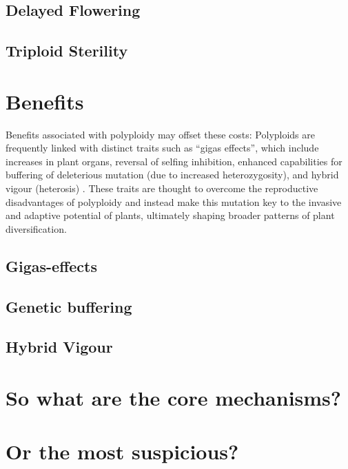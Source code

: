 \documentclass[openany, 12pt, draft]{book}
\begin{document}
\subsection{Delayed Flowering}\label{delayed-flowering}

\subsection{Triploid Sterility}\label{triploid-sterility}

\section{Benefits}\label{benefits}

Benefits associated with polyploidy may offset these costs: Polyploids
are frequently linked with distinct traits such as ``gigas effects'',
which include increases in plant organs, reversal of selfing inhibition,
enhanced capabilities for buffering of deleterious mutation (due to
increased heterozygosity), and hybrid vigour (heterosis)
\citep{Woodhouse2009, Ramsey2014}. These traits are thought to overcome
the reproductive disadvantages of polyploidy and instead make this
mutation key to the invasive and adaptive potential of plants,
ultimately shaping broader patterns of plant diversification.

\subsection{Gigas-effects}\label{gigas-effects}

\subsection{Genetic buffering}\label{genetic-buffering}

\subsection{Hybrid Vigour}\label{hybrid-vigour}

\section{So what are the core
mechanisms?}\label{so-what-are-the-core-mechanisms}

\section{Or the most suspicious?}\label{or-the-most-suspicious}
\end{document}
